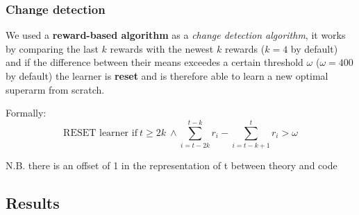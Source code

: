 \documentclass[11pt]{beamer}
\begin{document}
\begin{frame}
\frametitle{Change detection}

We used a \textbf{reward-based algorithm} as a \textit{change detection algorithm}, it works by comparing the last $k$ rewards with the newest $k$ rewards ($k=4$ by default) and if the difference between their means exceedes a certain threshold $\omega$ ($\omega=400$ by default) the learner is \textbf{reset} and is therefore able to learn a new optimal superarm from scratch.

Formally:
\begin{displaymath}
    \text{RESET learner if} ~ t \geq 2k ~ \land \sum_{i=t-2k}^{t-k} r_i -\sum_{i=t-k+1}^t r_i > \omega
\end{displaymath}

\scriptsize N.B. there is an offset of 1 in the representation of t between theory and code

\end{frame}


\subsection{Results}


\begin{frame}
\frametitle{}
\framesubtitle{}


\end{frame}


\end{document}
